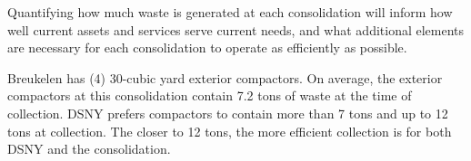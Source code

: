 
    Quantifying how much waste is generated at each consolidation will inform how well current assets and services serve current needs, and what additional elements are necessary for each consolidation to operate as efficiently as possible.
    
    Breukelen has (4) 30-cubic yard exterior compactors. On average, the exterior compactors at this consolidation contain 7.2 tons of waste at the time of collection. DSNY prefers compactors to contain more than 7 tons and up to 12 tons at collection. The closer to 12 tons, the more efficient collection is for both DSNY and the consolidation.